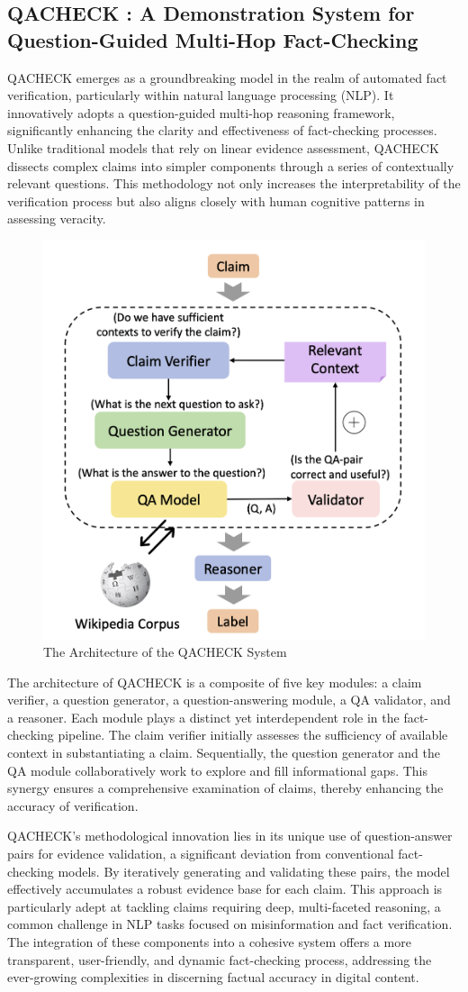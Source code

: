 \documentclass{article}
\begin{document}
\subsection{QACHECK : A Demonstration System for Question-Guided Multi-Hop Fact-Checking}
QACHECK \cite{pan2023qacheck} emerges as a groundbreaking model in the realm of automated fact verification, particularly within natural language processing (NLP). It innovatively adopts a question-guided multi-hop reasoning framework, significantly enhancing the clarity and effectiveness of fact-checking processes. Unlike traditional models that rely on linear evidence assessment, QACHECK dissects complex claims into simpler components through a series of contextually relevant questions. This methodology not only increases the interpretability of the verification process but also aligns closely with human cognitive patterns in assessing veracity. \par

\begin{figure}[h]
  \centering
  \includegraphics[width=0.4\linewidth]{Figure/Fig3.png}
  \caption{The Architecture of the QACHECK System}
\end{figure}

The architecture of QACHECK is a composite of five key modules: a claim verifier, a question generator, a question-answering module, a QA validator, and a reasoner. Each module plays a distinct yet interdependent role in the fact-checking pipeline. The claim verifier initially assesses the sufficiency of available context in substantiating a claim. Sequentially, the question generator and the QA module collaboratively work to explore and fill informational gaps. This synergy ensures a comprehensive examination of claims, thereby enhancing the accuracy of verification. \par
QACHECK's methodological innovation lies in its unique use of question-answer pairs for evidence validation, a significant deviation from conventional fact-checking models. By iteratively generating and validating these pairs, the model effectively accumulates a robust evidence base for each claim. This approach is particularly adept at tackling claims requiring deep, multi-faceted reasoning, a common challenge in NLP tasks focused on misinformation and fact verification. The integration of these components into a cohesive system offers a more transparent, user-friendly, and dynamic fact-checking process, addressing the ever-growing complexities in discerning factual accuracy in digital content.
\end{document}
